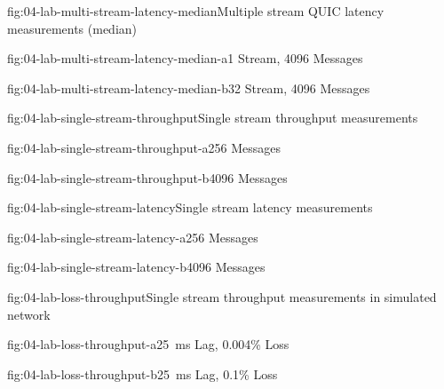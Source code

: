 \begin{myFigure}{fig:04-lab-multi-stream-latency-median}{Multiple stream QUIC latency measurements (median)}
\begin{mySubfigure}{0.49\linewidth}{fig:04-lab-multi-stream-latency-median-a}{1 Stream, \SI{4096}{\byte} Messages}
\footnotesize

\end{mySubfigure}
\begin{mySubfigure}{0.49\linewidth}{fig:04-lab-multi-stream-latency-median-b}{32 Stream, \SI{4096}{\byte} Messages}
\footnotesize

\end{mySubfigure}
\end{myFigure}

\begin{myFigure}{fig:04-lab-single-stream-throughput}{Single stream throughput measurements}
\begin{mySubfigure}{0.49\linewidth}{fig:04-lab-single-stream-throughput-a}{\SI{256}{\byte} Messages}
\footnotesize

\end{mySubfigure}
\begin{mySubfigure}{0.49\linewidth}{fig:04-lab-single-stream-throughput-b}{\SI{4096}{\byte} Messages}
\footnotesize

\end{mySubfigure}
\end{myFigure}

\begin{myFigure}{fig:04-lab-single-stream-latency}{Single stream latency measurements}
\begin{mySubfigure}{0.49\linewidth}{fig:04-lab-single-stream-latency-a}{\SI{256}{\byte} Messages}
\footnotesize

\end{mySubfigure}
\begin{mySubfigure}{0.49\linewidth}{fig:04-lab-single-stream-latency-b}{\SI{4096}{\byte} Messages}
\footnotesize

\end{mySubfigure}
\end{myFigure}

\begin{myFigure}{fig:04-lab-loss-throughput}{Single stream throughput measurements in simulated network}
\begin{mySubfigure}{0.49\linewidth}{fig:04-lab-loss-throughput-a}{\SI{25}{\milli\second} Lag, 0.004\% Loss}
\footnotesize

\end{mySubfigure}
\begin{mySubfigure}{0.49\linewidth}{fig:04-lab-loss-throughput-b}{\SI{25}{\milli\second} Lag, 0.1\% Loss}
\footnotesize

\end{mySubfigure}
\end{myFigure}

